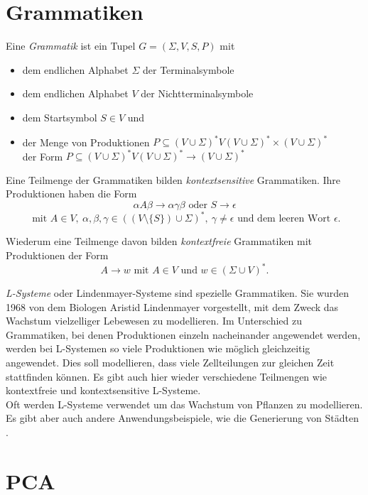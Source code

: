 \section{Grammatiken}

Eine \emph{Grammatik} ist ein Tupel $G = (\Sigma, V, S, P)$ mit 
\begin{itemize}
 \item dem endlichen Alphabet $\Sigma$ der Terminalsymbole
 \item dem endlichen Alphabet $V$ der Nichtterminalsymbole
 \item dem Startsymbol $S \in V$ und
 \item der Menge von Produktionen $P \subseteq (V \cup \Sigma)^* V (V \cup \Sigma)^* \times (V \cup \Sigma)^*$\\ der Form $P \subseteq (V \cup \Sigma)^* V (V \cup \Sigma)^* \rightarrow (V \cup \Sigma)^*$
\end{itemize}

Eine Teilmenge der Grammatiken bilden \emph{kontextsensitive} Grammatiken. Ihre Produktionen haben die Form
\[\alpha A \beta \rightarrow \alpha \gamma \beta \text{ oder } S \rightarrow \epsilon\] \[\text{ mit } A \in V,~ \alpha, \beta, \gamma \in ((V \setminus \{ S \}) \cup \Sigma)^*,~ \gamma \neq \epsilon \text{ und dem leeren Wort } \epsilon.\]

Wiederum eine Teilmenge davon bilden \emph{kontextfreie} Grammatiken mit Produktionen der Form 
\[A \rightarrow w \text{ mit } A \in V \text{ und } w \in (\Sigma \cup V)^*.\] \cite[Abschnitte 1.4 und 1.5]{FormalLanguageTheory}

\emph{L-Systeme} oder Lindenmayer-Systeme sind spezielle Grammatiken. Sie wurden 1968 von dem Biologen Aristid Lindenmayer vorgestellt, mit dem Zweck das Wachstum vielzelliger Lebewesen zu modellieren. Im Unterschied zu Grammatiken, bei denen Produktionen einzeln nacheinander angewendet werden, werden bei L-Systemen so viele Produktionen wie möglich gleichzeitig angewendet. Dies soll modellieren, dass viele Zellteilungen zur gleichen Zeit stattfinden können.
Es gibt auch hier wieder verschiedene Teilmengen wie \zb kontextfreie und kontextsensitive L-Systeme.\\
Oft werden L-Systeme verwendet um das Wachstum von Pflanzen zu modellieren. Es gibt aber auch andere Anwendungsbeispiele, wie \zb die Generierung von Städten \cite{cityGeneration}. \cite{Paramteric_L-Systems}



\section{PCA} %
\label{PCA}

